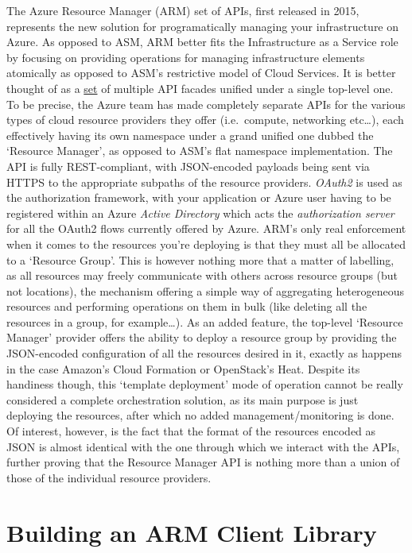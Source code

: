 \documentclass[11pt]{report}
\begin{document}
The Azure Resource Manager (ARM) set of APIs, first released in 2015,
represents the new solution for programatically managing your infrastructure on
Azure. As opposed to ASM, ARM better fits the Infrastructure as a Service
role by focusing on providing operations for managing infrastructure elements
atomically as opposed to ASM's restrictive model of Cloud Services. It is better
thought of as a \underline{set} of multiple API facades unified under a single
top-level one. To be precise, the Azure team has made completely separate APIs
for the various types of cloud resource providers they offer (i.e.\ compute,
networking etc\ldots), each effectively having its own namespace under a grand
unified one dubbed the `Resource Manager', as opposed to ASM's flat namespace
implementation. The API is fully REST-compliant, with JSON-encoded payloads
being sent via HTTPS to the appropriate subpaths of the resource providers.
\textit{OAuth2} is used as the authorization framework, with your application
or Azure user having to be registered within an Azure \textit{Active
Directory} which acts the \textit{authorization server} for all the OAuth2
flows currently offered by Azure. \newline
ARM's only real enforcement when it comes to the resources you're deploying is
that they must all be allocated to a `Resource Group'. This is however nothing
more that a matter of labelling, as all resources may freely communicate with
others across resource groups (but not locations), the mechanism offering a
simple way of aggregating heterogeneous resources and performing operations on
them in bulk (like deleting all the resources in a group, for example\ldots).
\newline
As an added feature, the top-level `Resource Manager' provider offers the
ability to deploy a resource group by providing the JSON-encoded configuration
of all the resources desired in it, exactly as happens in the case Amazon's
Cloud Formation or OpenStack's Heat. Despite its handiness though, this
`template deployment' mode of operation cannot be really considered a complete
orchestration solution, as its main purpose is just deploying the resources,
after which no added management/monitoring is done. Of interest, however, is
the fact that the format of the resources encoded as JSON is almost identical
with the one through which we interact with the APIs, further proving that the
Resource Manager API is nothing more than a union of those of the individual
resource providers.

\section{Building an ARM Client Library}
\end{document}
